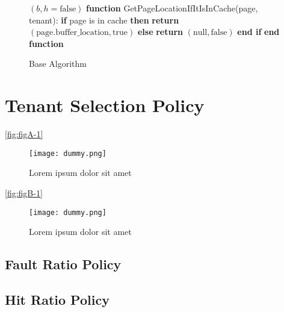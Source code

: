 \begin{figure}[htbp]
\begin{minipage}{\linewidth}
\begin{algorithm}[H]
\begin{algorithmic}
                    \RETURN $(b, h = \text{false})$
                \ENDIF
            \ENDIF
            \STATE
            \STATE \textbf{function} GetPageLocationIfItIsInCache(page, tenant):
            \STATE \hspace{\algorithmicindent} \textbf{if} page is in cache \textbf{then}
            \STATE \hspace{\algorithmicindent} \hspace{\algorithmicindent} \textbf{return} $(\text{page.buffer\_location}, \text{true})$
            \STATE \hspace{\algorithmicindent} \textbf{else}
            \STATE \hspace{\algorithmicindent} \hspace{\algorithmicindent} \textbf{return} $(\text{null}, \text{false})$
            \STATE \hspace{\algorithmicindent} \textbf{end if}
            \STATE \textbf{end function}
        \end{algorithmic}
    \end{algorithm}
    \caption{Base Algorithm}
    \label{fig:base_algorithm}
    \end{minipage}
\end{figure}
    

\section{Tenant Selection Policy}

\lipsum[1-1] \ref{fig:figA-1}

\begin{figure}[H]
    \centering
    \texttt{[image: dummy.png]}
    \caption{Lorem ipsum dolor sit amet}
    \label{fig:figA-2}
\end{figure}

\lipsum[1-1] \ref{fig:figB-1}

\begin{figure}[H]
    \centering
    \texttt{[image: dummy.png]}
    \caption{Lorem ipsum dolor sit amet}
    \label{fig:figB-2}
\end{figure}

\subsection{Fault Ratio Policy}

\lipsum[1-1] \cite{reference-1}

\subsection{Hit Ratio Policy}

